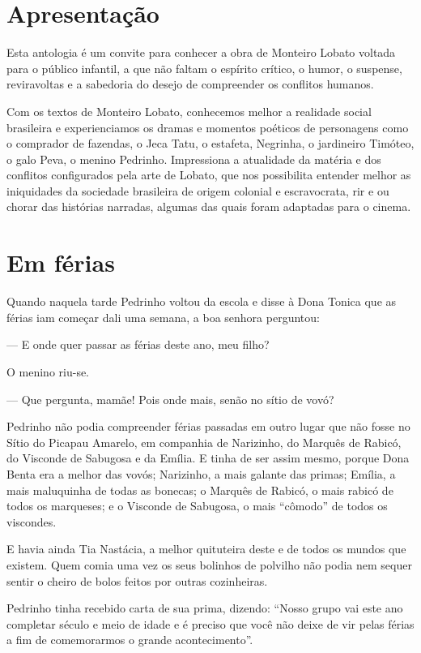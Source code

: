 \chapter{Apresentação}

Esta antologia é um convite para conhecer a obra de Monteiro Lobato
voltada para o público infantil, a que não faltam o espírito crítico, o
humor, o suspense, reviravoltas e a sabedoria do desejo de compreender
os conflitos humanos.

Com os textos de Monteiro Lobato, conhecemos melhor a realidade social
brasileira e experienciamos os dramas e momentos poéticos de personagens
como o comprador de fazendas, o Jeca Tatu, o estafeta, Negrinha, o
jardineiro Timóteo, o galo Peva, o menino Pedrinho. Impressiona a
atualidade da matéria e dos conflitos configurados pela arte de Lobato,
que nos possibilita entender melhor as iniquidades da sociedade
brasileira de origem colonial e escravocrata, rir e ou chorar das
histórias narradas, algumas das quais foram adaptadas para o cinema.

\chapter{Em férias}

Quando naquela tarde Pedrinho voltou da escola e disse à Dona Tonica que
as férias iam começar dali uma semana, a boa senhora perguntou:

--- E onde quer passar as férias deste ano, meu filho?

O menino riu-se.

--- Que pergunta, mamãe! Pois onde mais, senão no sítio de vovó?

Pedrinho não podia compreender férias passadas em outro lugar que não
fosse no Sítio do Picapau Amarelo, em companhia de Narizinho, do Marquês
de Rabicó, do Visconde de Sabugosa e da Emília. E tinha de ser assim
mesmo, porque Dona Benta era a melhor das vovós; Narizinho, a mais
galante das primas; Emília, a mais maluquinha de todas as bonecas; o
Marquês de Rabicó, o mais rabicó de todos os marqueses; e o Visconde de
Sabugosa, o mais ``cômodo'' de todos os viscondes.

E havia ainda Tia Nastácia, a melhor quituteira deste e de todos os
mundos que existem. Quem comia uma vez os seus bolinhos de polvilho não
podia nem sequer sentir o cheiro de bolos feitos por outras cozinheiras.

Pedrinho tinha recebido carta de sua prima, dizendo: ``Nosso grupo vai
este ano completar século e meio de idade e é preciso que você não deixe
de vir pelas férias a fim de comemorarmos o grande acontecimento''.

